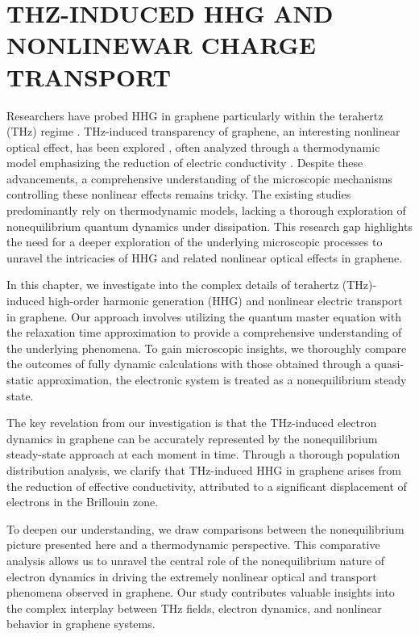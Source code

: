 \chapter{THZ-INDUCED HHG AND NONLINEWAR CHARGE TRANSPORT \label{ch:ch4}}

Researchers have probed HHG in graphene particularly within the terahertz (THz) regime \cite{hafez2018extremely,kovalev2021electrical}. THz-induced transparency of graphene, an interesting nonlinear optical effect, has been explored \cite{Hwang2013,Paul_2013,doi:10.1063/1.4902999}, often analyzed through a thermodynamic model emphasizing the reduction of electric conductivity \cite{mics2015thermodynamic,kovalev2021electrical}.
Despite these advancements, a comprehensive understanding of the microscopic mechanisms controlling these nonlinear effects remains tricky. The existing studies predominantly rely on thermodynamic models, lacking a thorough exploration of nonequilibrium quantum dynamics under dissipation. This research gap highlights the need for a deeper exploration of the underlying microscopic processes to unravel the intricacies of HHG and related nonlinear optical effects in graphene.

In this chapter, we investigate into the complex details of terahertz (THz)-induced high-order harmonic generation (HHG) and nonlinear electric transport in graphene. Our approach involves utilizing the quantum master equation with the relaxation time approximation to provide a comprehensive understanding of the underlying phenomena. To gain microscopic insights, we thoroughly compare the outcomes of fully dynamic calculations with those obtained through a quasi-static approximation,  the electronic system is treated as a nonequilibrium steady state.

The key revelation from our investigation is that the THz-induced electron dynamics in graphene can be accurately represented by the nonequilibrium steady-state approach at each moment in time. Through a thorough population distribution analysis, we clarify that THz-induced HHG in graphene arises from the reduction of effective conductivity, attributed to a significant displacement of electrons in the Brillouin zone.

To deepen our understanding, we draw comparisons between the nonequilibrium picture presented here and a thermodynamic perspective. This comparative analysis allows us to unravel the central role of the nonequilibrium nature of electron dynamics in driving the extremely nonlinear optical and transport phenomena observed in graphene. Our study contributes valuable insights into the complex interplay between THz fields, electron dynamics, and nonlinear behavior in graphene systems.

